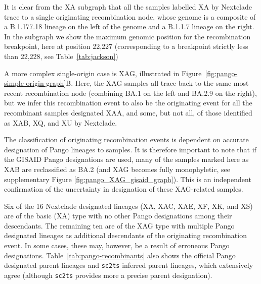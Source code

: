\documentclass{article}
\begin{document}
It is clear from the XA subgraph that all the samples labelled XA by Nextclade trace to a
single originating recombination node, whose genome is a composite of a B.1.177.18 lineage
on the left of the genome and a B.1.1.7 lineage on the right. In the subgraph we show
the maximum genomic position for the recombination breakpoint, here at position 22,227
(corresponding to a breakpoint strictly less than 22,228, see Table~\ref{tab:jackson})


A more complex single-origin case is XAG, illustrated in
Figure~\ref{fig:pango-simple-origin-graph}B. Here, the XAG samples
all trace back to the same most recent recombination node
(combining BA.1 on the left and BA.2.9 on the right), but
we infer this recombination event to also be the originating event for
all the recombinant samples designated XAA,
and some, but not all, of those identified as XAB, XQ, and XU by Nextclade.

The classification of originating recombination events is dependent on
accurate designation of Pango lineages to samples. It is therefore important
to note that if the GISAID Pango designations are used, many of the samples
marked here as XAB are reclassified as BA.2 (and XAG becomes fully monophyletic,
see supplementary Figure \ref{fig:pango_XAG_gisaid_graph}). This is an
independent confirmation of the uncertainty in designation of these XAG-related
samples.

Six of the 16 Nextclade designated lineages (XA, XAC, XAE, XF, XK, and XS) are of the
basic (XA) type with no other Pango designations among their descendants.
The remaining ten are of the XAG type with multiple Pango
designated lineages as additional descendants of the originating recombination event.
In some cases,
these may, however, be a result of erroneous Pango designations.
Table~\ref{tab:pango-recombinants} also shows the official
Pango designated parent lineages and \texttt{sc2ts} inferred parent lineages,
which extensively agree (although \texttt{sc2ts} provides more a precise
parent designation).
\end{document}
